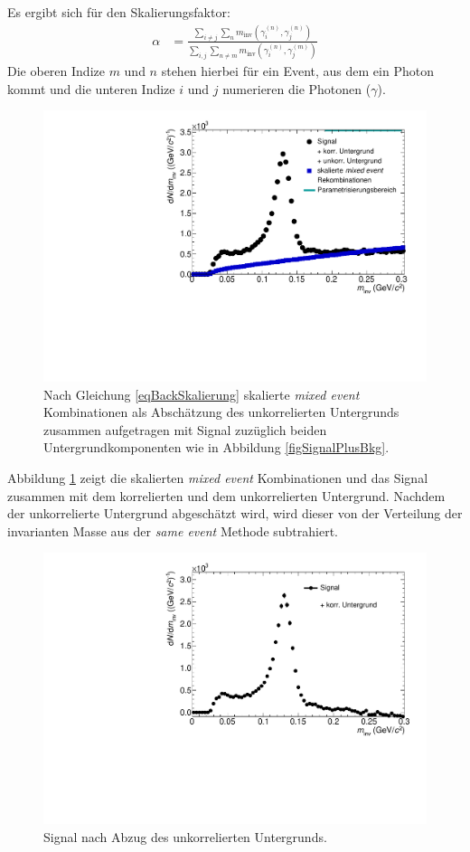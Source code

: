 Es ergibt sich für den Skalierungsfaktor:
\begin{align}
\label{eqBackSkalierung}
\alpha &= \frac{\sum_{i \neq j}\sum_{n}m_{\text{inv}}\left( \gamma^{(n)}_{i},\gamma^{(n)}_{j}\right) }{\sum_{i,j}\sum_{n \neq m}m_{\text{inv}}\left( \gamma^{(n)}_{i},\gamma^{(m)}_{j}\right) }
\end{align}
Die oberen Indize $m$ und $n$ stehen hierbei für ein Event, aus dem ein Photon kommt und die unteren Indize $i$ und $j$ numerieren die Photonen ($\gamma$).
\begin{figure}[tp]
\centering
\includegraphics[width=.75\linewidth]{hUncorrBkgNorm.pdf}
\caption{Nach Gleichung \ref{eqBackSkalierung} skalierte {\it mixed event} Kombinationen als Abschätzung des unkorrelierten Untergrunds zusammen aufgetragen mit Signal zuzüglich beiden Untergrundkomponenten wie in Abbildung \ref{figSignalPlusBkg}.}
\label{figUncorrBkgNorm}
\end{figure}
\newline
Abbildung \ref{figUncorrBkgNorm} zeigt die skalierten \textit{mixed event} Kombinationen und das Signal zusammen mit dem korrelierten und dem unkorrelierten Untergrund.
Nachdem der unkorrelierte Untergrund abgeschätzt wird, wird dieser von der Verteilung der invarianten Masse aus der \textit{same event} Methode subtrahiert.
\begin{figure}[tp]
\centering
\includegraphics[width=.75\linewidth]{hInvMass_Data.pdf}
\caption{Signal nach Abzug des unkorrelierten Untergrunds.}
\label{figInvMass_Data}
\end{figure}
